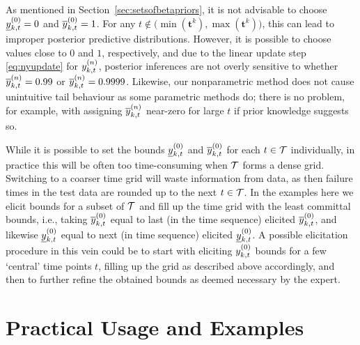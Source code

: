 \documentclass[12pt, a4paper]{elsarticle}
\newcommand{\bs}[1]{\boldsymbol{#1}}
\renewcommand{\vec}[1]{{\bs#1}}
\newcommand{\Rsys}{R_\text{sys}}
\begin{document}
As mentioned in Section~\ref{sec:setsofbetapriors},
it is not advisable to choose $\underline{y}^{(0)}_{k,t} = 0$ and $\overline{y}^{(0)}_{k,t} = 1$.
For any $t \not\in \big(\min(\vec{t}^k), \max(\vec{t}^k)\big)$,
this can lead to improper posterior predictive distributions.
However, it is possible to choose values close to $0$ and $1$, respectively,
and due to the linear update step \eqref{eq:nyupdate} for $y^{(n)}_{k,t}$,
posterior inferences are not overly sensitive to whether $\overline{y}^{(n)}_{k,t} = 0.99$ or $\overline{y}^{(n)}_{k,t} = 0.9999$.
Likewise, our nonparametric method does not cause unintuitive tail behaviour
as some parametric methods do;
there is no problem, for example, with assigning $\overline{y}^{(n)}_{k,t}$ near-zero for large $t$ if prior knowledge suggests so.

While it is possible to set the bounds $\underline{y}^{(0)}_{k,t}$ and $\overline{y}^{(0)}_{k,t}$ for each $t \in {\cal T}$ individually,
in practice this will be often too time-consuming when ${\cal T}$ forms a dense grid.
Switching to a coarser time grid will waste information from data,
as then failure times in the test data are rounded up to the next $t \in {\cal T}$.
In the examples here we elicit bounds for a subset of ${\cal T}$
and fill up the time grid with the least committal bounds, i.e.,
taking $\overline{y}^{(0)}_{k,t}$ equal to last (in the time sequence) elicited $\overline{y}^{(0)}_{k,t}$,
and likewise $\underline{y}^{(0)}_{k,t}$ equal to next (in time sequence) elicited $\underline{y}^{(0)}_{k,t}$.
A possible elicitation procedure in this vein could be
to start with eliciting $y^{(0)}_{k,t}$ bounds for a few `central' time points $t$,
filling up the grid as described above accordingly,
and then to further refine the obtained bounds as deemed necessary by the expert.


\section{Practical Usage and Examples}
\label{sec:examples}
\end{document}
